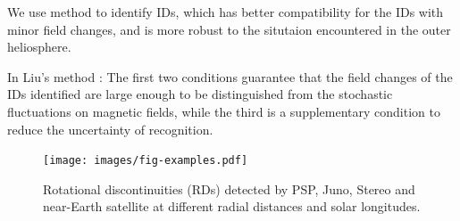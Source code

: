 \documentclass[
  letterpaper,
  DIV=11,
  numbers=noendperiod]{scrartcl}
\begin{document}
We use \citep{liu2022a} method to identify IDs, which has better
compatibility for the IDs with minor field changes, and is more robust
to the situtaion encountered in the outer heliosphere.

In Liu's method : The first two conditions guarantee that the field
changes of the IDs identiﬁed are large enough to be distinguished from
the stochastic fluctuations on magnetic fields, while the third is a
supplementary condition to reduce the uncertainty of recognition.

\begin{figure}[H]

{\centering \texttt{[image: images/fig-examples.pdf]}

}

\caption{Rotational discontinuities (RDs) detected by PSP, Juno, Stereo
and near-Earth satellite at different radial distances and solar
longitudes.}

\end{figure}%


  
\end{document}

